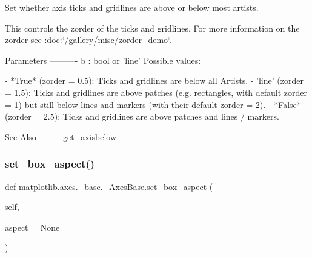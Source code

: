 \begin{DoxyVerb}Set whether axis ticks and gridlines are above or below most artists.

This controls the zorder of the ticks and gridlines. For more
information on the zorder see :doc:`/gallery/misc/zorder_demo`.

Parameters
----------
b : bool or 'line'
    Possible values:

    - *True* (zorder = 0.5): Ticks and gridlines are below all Artists.
    - 'line' (zorder = 1.5): Ticks and gridlines are above patches
      (e.g. rectangles, with default zorder = 1) but still below lines
      and markers (with their default zorder = 2).
    - *False* (zorder = 2.5): Ticks and gridlines are above patches
      and lines / markers.

See Also
--------
get_axisbelow
\end{DoxyVerb}
 \mbox{\label{classmatplotlib_1_1axes_1_1__base_1_1__AxesBase_add4af0efc6b6894f19e31e5f29159916}} 
\subsubsection{\texorpdfstring{set\+\_\+box\+\_\+aspect()}{set\_box\_aspect()}}
{\footnotesize\ttfamily def matplotlib.\+axes.\+\_\+base.\+\_\+\+Axes\+Base.\+set\+\_\+box\+\_\+aspect (\begin{DoxyParamCaption}\item[{}]{self,  }\item[{}]{aspect = {\ttfamily None} }\end{DoxyParamCaption})}

